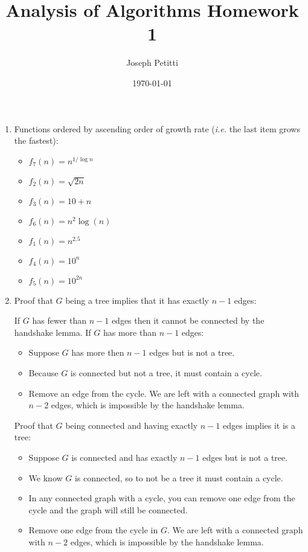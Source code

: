 \documentclass[a4paper, 10pt]{article}
\title{Analysis of Algorithms Homework 1}
\author{Joseph Petitti}
\date{\today}
\begin{document}
\maketitle

\begin{enumerate}
	\item Functions ordered by ascending order of growth rate (\textit{i.e.} the
		last item grows the fastest):
		\begin{itemize}
			\item $f_7(n) = n^{1 / \log n}$
			\item $f_2(n) = \sqrt{2n}$
			\item $f_3(n) = 10 + n$
			\item $f_6(n) = n^2 \log (n)$
			\item $f_1(n) = n^{2.5}$
			\item $f_4(n) = 10^{n}$
			\item $f_5(n) = 10^{2n}$
		\end{itemize}

	\item Proof that $G$ being a tree implies that it has exactly $n - 1$ edges:

		If $G$ has fewer than $n - 1$ edges then it cannot be connected by the
		handshake lemma. If $G$ has more than $n - 1$ edges:
		\begin{itemize}
			\item Suppose $G$ has more then $n - 1$ edges but  is not a tree.
			\item Because $G$ is connected but not a tree, it must contain a
				cycle.
			\item Remove an edge from the cycle. We are left with a connected
				graph with $n - 2$ edges, which is impossible by the handshake
				lemma.
		\end{itemize}

		Proof that $G$ being connected and having exactly $n - 1$ edges implies
		it is a tree:
		\begin{itemize}
			\item Suppose $G$ is connected and has exactly $n - 1$ edges but is
				not a tree.
			\item We know $G$ is connected, so to not be a tree it must contain
				a cycle.
			\item In any connected graph with a cycle, you can remove one edge
				from the cycle and the graph will still be connected.
			\item Remove one edge from the cycle in $G$. We are left with a
				connected graph with $n - 2$ edges, which is impossible by the
				handshake lemma.
		\end{itemize}


\end{enumerate}
\end{document}
